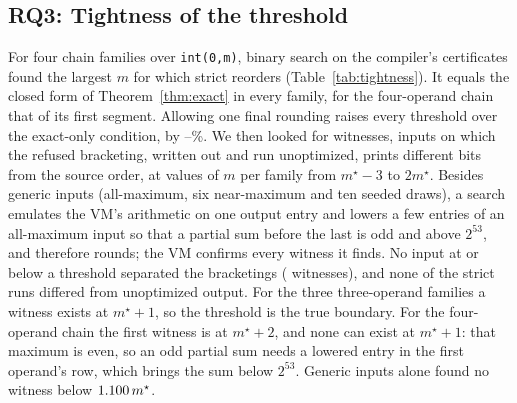 \documentclass[acmsmall,review,anonymous,nonacm]{acmart}
\begin{document}
\subsection{RQ3: Tightness of the threshold}\label{sec:rq3}
\begin{table}[t]
\caption{RQ3. Largest $m$ for which strict reorders \texttt{int(0,m)} chains:
under the exact-only condition, by Theorem~\ref{thm:exact} in closed form, and
found by binary search on the compiler's certificates; the smallest $m$ with a
confirmed witness; strict runs that differed from unoptimized output.}
\label{tab:tightness}\centering\footnotesize

\end{table}
For four chain families over \texttt{int(0,m)}, binary search on the
compiler's certificates found the largest $m$ for which strict reorders
(Table~\ref{tab:tightness}). It equals the closed form of
Theorem~\ref{thm:exact} in every family, for the four-operand chain that of its
first segment. Allowing one final rounding raises every threshold over the
exact-only condition, by \RqThreeRaiseLo--\RqThreeRaiseHi\%. We then looked for
witnesses, inputs on which the refused bracketing, written out and run
unoptimized, prints different bits from the source order, at
\RqThreeValuesPerFamily{} values of $m$ per family from $m^\star-3$ to
$2m^\star$. Besides generic inputs (all-maximum, six near-maximum and ten seeded
draws), a search emulates the VM's arithmetic on one output entry and lowers a
few entries of an all-maximum input so that a partial sum before the last is
odd and above $2^{53}$, and therefore rounds; the VM confirms every witness it
finds. No input at or below a threshold separated the bracketings
(\RqThreeWitnessedBelow{} witnesses), and none of the \RqThreeRuns{} strict runs
differed from unoptimized output. For the three three-operand families a witness
exists at $m^\star+1$, so the threshold is the true boundary. For the
four-operand chain the first witness is at $m^\star+2$, and none can exist at
$m^\star+1$: that maximum is even, so an odd partial sum needs a lowered entry
in the first operand's row, which brings the sum below $2^{53}$. Generic inputs
alone found no witness below $1.100\,m^\star$.
\end{document}
